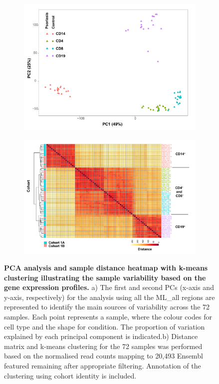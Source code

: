 \begin{figure}[htbp]
\centering
\begin{subfigure}{0.5\textwidth}
\centering
\includegraphics[width=\textwidth]{./Results2/pdfs/PS_CTL_all_samples_varied_PCA1and2_plot}
\caption{\textbf{}}
\end{subfigure}
\begin{subfigure}{0.5\textwidth}
\centering
\includegraphics[width=\textwidth]{./Results2/pdfs/PS_CTL_all_samples_heatmap_including_batch}
\caption{\textbf{}}
\end{subfigure}
\caption[PCA analysis and  sample distance heatmap with k-means clustering illustrating the sample variability based on the gene expression profiles.]{\textbf{PCA analysis and  sample distance heatmap with k-means clustering illustrating the sample variability based on the gene expression profiles.} a) The first and second PCs (x-axis and y-axis, respectively) for the analysis using all the ML\_all regions are represented to identify the main sources of variability across the 72 samples. Each point represents a sample, where the colour codes for cell type and the shape for condition. The proportion of variation explained by each principal component is indicated.b) Distance matrix and k-means clustering for the 72 samples was performed based on the normalised read counts mapping to 20,493 Ensembl featured remaining after appropriate filtering. Annotation of the clustering using cohort identity is included.}

\end{figure}
